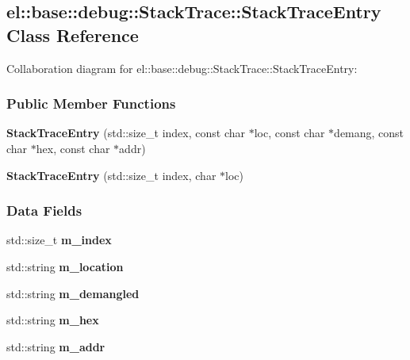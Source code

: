 \hypertarget{a00083}{}\subsection{el\+:\+:base\+:\+:debug\+:\+:Stack\+Trace\+:\+:Stack\+Trace\+Entry Class Reference}
\label{a00083}


Collaboration diagram for el\+:\+:base\+:\+:debug\+:\+:Stack\+Trace\+:\+:Stack\+Trace\+Entry\+:
\subsubsection*{Public Member Functions}
\begin{DoxyCompactItemize}
\item 
\hypertarget{a00083_a49b21719794ee5de7f70e2558ebcba9e}{}{\bfseries Stack\+Trace\+Entry} (std\+::size\+\_\+t index, const char $\ast$loc, const char $\ast$demang, const char $\ast$hex, const char $\ast$addr)\label{a00083_a49b21719794ee5de7f70e2558ebcba9e}

\item 
\hypertarget{a00083_a9fbf0675fe713b1ac4ec692bbe661afe}{}{\bfseries Stack\+Trace\+Entry} (std\+::size\+\_\+t index, char $\ast$loc)\label{a00083_a9fbf0675fe713b1ac4ec692bbe661afe}

\end{DoxyCompactItemize}
\subsubsection*{Data Fields}
\begin{DoxyCompactItemize}
\item 
\hypertarget{a00083_a8361364e2cbb728a2e2a17db8b308842}{}std\+::size\+\_\+t {\bfseries m\+\_\+index}\label{a00083_a8361364e2cbb728a2e2a17db8b308842}

\item 
\hypertarget{a00083_aaf6f6c49736d5c10b2047dde6eef4a38}{}std\+::string {\bfseries m\+\_\+location}\label{a00083_aaf6f6c49736d5c10b2047dde6eef4a38}

\item 
\hypertarget{a00083_a7ca2c3d08ea6fbef5b605041500c7d47}{}std\+::string {\bfseries m\+\_\+demangled}\label{a00083_a7ca2c3d08ea6fbef5b605041500c7d47}

\item 
\hypertarget{a00083_af4d5ffabfe8bbffb5eedcdd95b4eebfe}{}std\+::string {\bfseries m\+\_\+hex}\label{a00083_af4d5ffabfe8bbffb5eedcdd95b4eebfe}

\item 
\hypertarget{a00083_a11b23a57f14add4b825d97bb1d58e6f2}{}std\+::string {\bfseries m\+\_\+addr}\label{a00083_a11b23a57f14add4b825d97bb1d58e6f2}

\end{DoxyCompactItemize}
